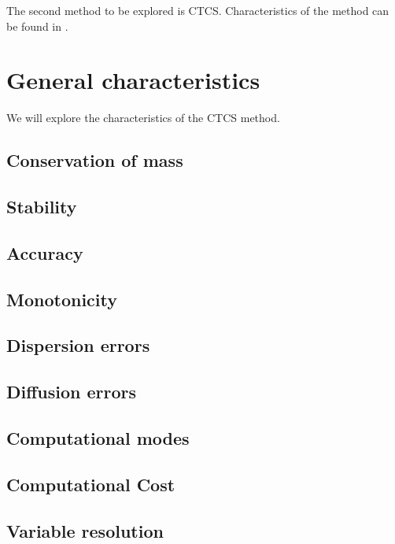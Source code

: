 

The second method to be explored is CTCS. Characteristics of the method can be found in \cite{mpebook}.


\section{General characteristics}
We will explore the characteristics of the CTCS method.

\subsection{Conservation of mass} \label{conservationctcs}

\subsection{Stability} \label{stabilityctcs}


\subsection{Accuracy}

\subsection{Monotonicity}

\subsection{Dispersion errors}

\subsection{Diffusion errors}

\subsection{Computational modes}

\subsection{Computational Cost}

\subsection{Variable resolution}

